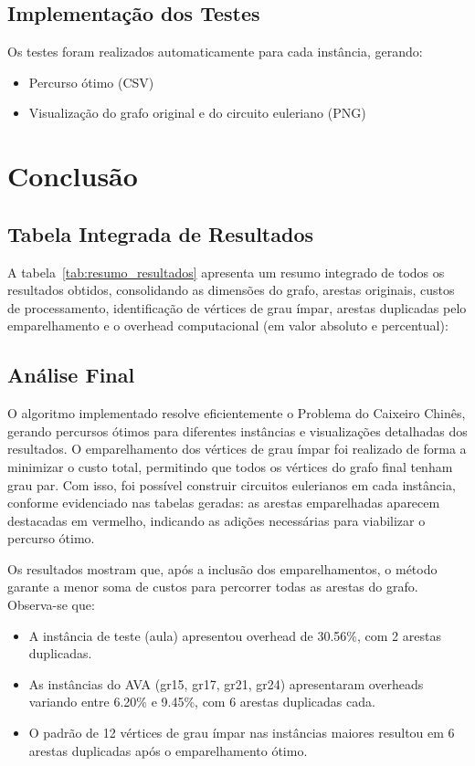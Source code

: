 \documentclass[12pt]{article}
\begin{document}
\subsection{Implementação dos Testes}
Os testes foram realizados automaticamente para cada instância, gerando:
\begin{itemize}
    \item Percurso ótimo (CSV)
    \item Visualização do grafo original e do circuito euleriano (PNG)
\end{itemize}

\section{Conclusão}

\subsection{Tabela Integrada de Resultados}
A tabela~\ref{tab:resumo_resultados} apresenta um resumo integrado de todos os resultados obtidos, consolidando as dimensões do grafo, arestas originais, custos de processamento, identificação de vértices de grau ímpar, arestas duplicadas pelo emparelhamento e o overhead computacional (em valor absoluto e percentual):



\subsection{Análise Final}
O algoritmo implementado resolve eficientemente o Problema do Caixeiro Chinês, gerando percursos ótimos para diferentes instâncias e visualizações detalhadas dos resultados. O emparelhamento dos vértices de grau ímpar foi realizado de forma a minimizar o custo total, permitindo que todos os vértices do grafo final tenham grau par. Com isso, foi possível construir circuitos eulerianos em cada instância, conforme evidenciado nas tabelas geradas: as arestas emparelhadas aparecem destacadas em vermelho, indicando as adições necessárias para viabilizar o percurso ótimo.

Os resultados mostram que, após a inclusão dos emparelhamentos, o método garante a menor soma de custos para percorrer todas as arestas do grafo. Observa-se que:
\begin{itemize}
    \item A instância de teste (aula) apresentou overhead de 30.56\%, com 2 arestas duplicadas.
    \item As instâncias do AVA (gr15, gr17, gr21, gr24) apresentaram overheads variando entre 6.20\% e 9.45\%, com 6 arestas duplicadas cada.
    \item O padrão de 12 vértices de grau ímpar nas instâncias maiores resultou em 6 arestas duplicadas após o emparelhamento ótimo.
\end{itemize}
\end{document}
